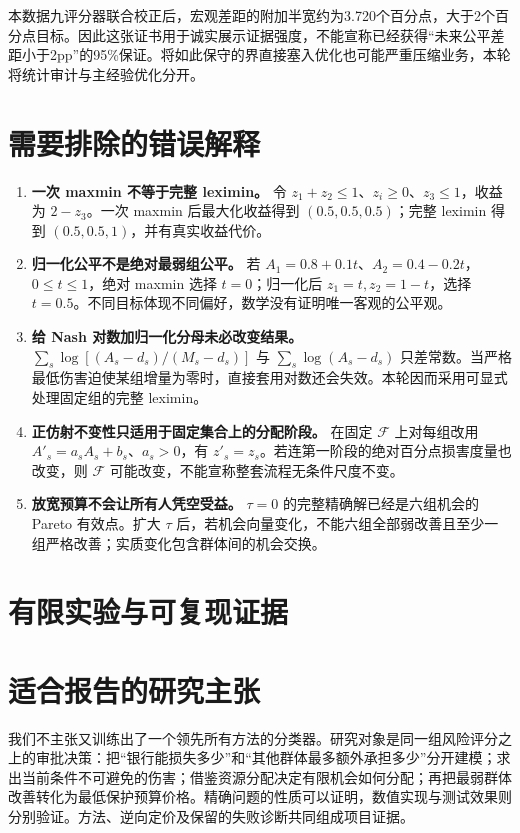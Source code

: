 \documentclass[UTF8,11pt,fontset=fandol]{ctexart}
\newcommand{\F}{\mathcal F}
\begin{document}
本数据九评分器联合校正后，宏观差距的附加半宽约为3.720个百分点，大于2个百分点目标。因此这张证书用于诚实展示证据强度，不能宣称已经获得“未来公平差距小于2pp”的95\%保证。将如此保守的界直接塞入优化也可能严重压缩业务，本轮将统计审计与主经验优化分开。

\section{需要排除的错误解释}
\begin{enumerate}
\item \textbf{一次 maxmin 不等于完整 leximin。}
令 $z_1+z_2\le1$、$z_i\ge0$、$z_3\le1$，收益为 $2-z_3$。一次 maxmin 后最大化收益得到 $(0.5,0.5,0.5)$；完整 leximin 得到 $(0.5,0.5,1)$，并有真实收益代价。
\item \textbf{归一化公平不是绝对最弱组公平。}
若 $A_1=0.8+0.1t$、$A_2=0.4-0.2t$，$0\le t\le1$，绝对 maxmin 选择 $t=0$；归一化后 $z_1=t,z_2=1-t$，选择 $t=0.5$。不同目标体现不同偏好，数学没有证明唯一客观的公平观。
\item \textbf{给 Nash 对数加归一化分母未必改变结果。}
$\sum_s\log[(A_s-d_s)/(M_s-d_s)]$ 与 $\sum_s\log(A_s-d_s)$ 只差常数。当严格最低伤害迫使某组增量为零时，直接套用对数还会失效。本轮因而采用可显式处理固定组的完整 leximin。
\item \textbf{正仿射不变性只适用于固定集合上的分配阶段。}
在固定 $\F$ 上对每组改用 $A'_s=a_sA_s+b_s$、$a_s>0$，有 $z'_s=z_s$。若连第一阶段的绝对百分点损害度量也改变，则 $\F$ 可能改变，不能宣称整套流程无条件尺度不变。
\item \textbf{放宽预算不会让所有人凭空受益。}
$\tau=0$ 的完整精确解已经是六组机会的 Pareto 有效点。扩大 $\tau$ 后，若机会向量变化，不能六组全部弱改善且至少一组严格改善；实质变化包含群体间的机会交换。
\end{enumerate}

\section{有限实验与可复现证据}


\section{适合报告的研究主张}
我们不主张又训练出了一个领先所有方法的分类器。研究对象是同一组风险评分之上的审批决策：把“银行能损失多少”和“其他群体最多额外承担多少”分开建模；求出当前条件不可避免的伤害；借鉴资源分配决定有限机会如何分配；再把最弱群体改善转化为最低保护预算价格。精确问题的性质可以证明，数值实现与测试效果则分别验证。方法、逆向定价及保留的失败诊断共同组成项目证据。
\end{document}
